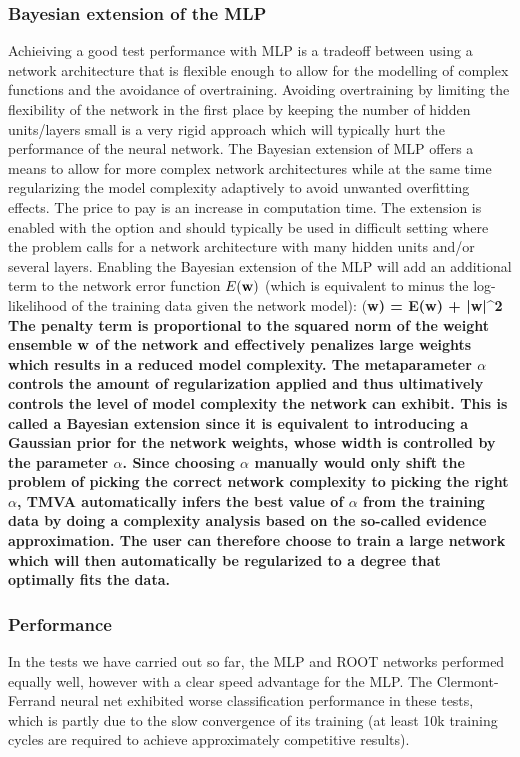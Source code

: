 \subsubsection{Bayesian extension of the MLP}
\label{sec:ann:bayes}
Achieiving a good test performance with MLP is a tradeoff between using a network architecture that is flexible enough to allow for the modelling of complex functions and the avoidance of overtraining. Avoiding overtraining by limiting the flexibility of the network in the first place by keeping the number of hidden units/layers small is a very rigid approach which will typically hurt the performance of the neural network. The Bayesian extension of MLP offers a means to allow for more complex network architectures while at the same time regularizing the model complexity adaptively to avoid unwanted overfitting effects. The price to pay is an increase in computation time. The extension is enabled with the option  and should typically be used in difficult setting where the problem calls for a network architecture with many hidden units and/or several layers.
Enabling the Bayesian extension of the MLP will add an additional term to the network error function $E(\bf w)$ (which is equivalent to minus the log-likelihood of the training data given the network model):
\beq
  \label{eq:mlp:penalty}
	(\bf w) = E(\bf w) + \alpha\bf |w|^2
\eeq
The penalty term is proportional to the squared norm of the weight ensemble $\bf w$ of the network and effectively penalizes large weights which results in a reduced model complexity. The metaparameter $\alpha$ controls the amount of regularization applied and thus ultimatively controls the level of model complexity the network can exhibit. This is called a Bayesian extension since it is equivalent to introducing a Gaussian prior for the network weights, whose width is controlled by the parameter $\alpha$. Since choosing $\alpha$ manually would only shift the problem of picking the correct network complexity to picking the right $\alpha$, TMVA automatically infers the best value of $\alpha$ from the training data by doing a complexity analysis based on the so-called evidence approximation. The user can therefore choose to train a large network which will then automatically be regularized to a degree that optimally fits the data.
	
\subsubsection{Performance}
\label{sec:ann:perf}

In the tests we have carried out so far, the MLP and ROOT networks performed equally well, 
however with a clear speed advantage for the MLP. The Clermont-Ferrand neural net
exhibited worse classification performance in these tests, which is partly due to the slow 
convergence of its training (at least 10k training cycles are required to achieve 
approximately competitive results). 

